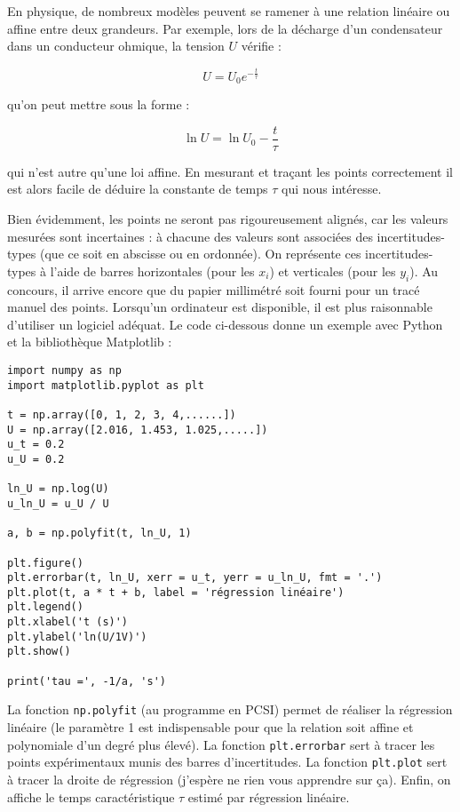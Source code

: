 \documentclass[10pt]{article}
\begin{document}
\begin{multicols}{2}
En physique, de nombreux modèles peuvent se ramener à une relation linéaire ou affine entre deux grandeurs. Par exemple, lors de la décharge d’un condensateur dans un conducteur ohmique, la tension $U$ vérifie :

\[
U = U_0 e^{-\frac{t}{\tau}}
\]

qu’on peut mettre sous la forme :

\[
\ln U = \ln U_0 - \frac{t}{\tau}
\]

qui n’est autre qu’une loi affine. En mesurant et traçant les points correctement il est alors facile de déduire la constante de temps $\tau$ qui nous intéresse.

Bien évidemment, les points ne seront pas rigoureusement alignés, car les valeurs mesurées sont incertaines : à chacune des valeurs sont associées des incertitudes-types (que ce soit en abscisse ou en ordonnée). On représente ces incertitudes-types à l’aide de barres horizontales (pour les $x_i$) et verticales (pour les $y_i$). Au concours, il arrive encore que du papier millimétré soit fourni pour un tracé manuel des points. Lorsqu’un ordinateur est disponible, il est plus raisonnable d’utiliser un logiciel adéquat. Le code ci-dessous donne un exemple avec Python et la bibliothèque Matplotlib :

\begin{verbatim}
import numpy as np
import matplotlib.pyplot as plt

t = np.array([0, 1, 2, 3, 4,......])
U = np.array([2.016, 1.453, 1.025,.....])
u_t = 0.2
u_U = 0.2

ln_U = np.log(U)
u_ln_U = u_U / U

a, b = np.polyfit(t, ln_U, 1)

plt.figure()
plt.errorbar(t, ln_U, xerr = u_t, yerr = u_ln_U, fmt = '.')
plt.plot(t, a * t + b, label = 'régression linéaire')
plt.legend()
plt.xlabel('t (s)')
plt.ylabel('ln(U/1V)')
plt.show()

print('tau =', -1/a, 's')
\end{verbatim}

La fonction \texttt{np.polyfit} (au programme en PCSI) permet de réaliser la régression linéaire (le paramètre 1 est indispensable pour que la relation soit affine et polynomiale d’un degré plus élevé). La fonction \texttt{plt.errorbar} sert à tracer les points expérimentaux munis des barres d’incertitudes. La fonction \texttt{plt.plot} sert à tracer la droite de régression (j'espère ne rien vous apprendre sur ça). Enfin, on affiche le temps caractéristique $\tau$ estimé par régression linéaire.\\


\end{multicols}
\end{document}
